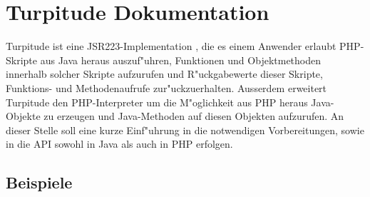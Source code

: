 \chapter{Turpitude Dokumentation}
\label{sec:app1}

Turpitude ist eine JSR223-Implementation \cite{JSRHP}, die es einem Anwender erlaubt PHP-Skripte
aus Java heraus auszuf"uhren, Funktionen und Objektmethoden innerhalb solcher Skripte aufzurufen
und R"uckgabewerte dieser Skripte, Funktions- und Methodenaufrufe zur"uckzuerhalten.
Ausserdem erweitert Turpitude den PHP-Interpreter um die M"oglichkeit aus PHP heraus
Java-Objekte zu erzeugen und Java-Methoden auf diesen Objekten aufzurufen.
An dieser Stelle soll eine kurze Einf"uhrung in die notwendigen Vorbereitungen, sowie
in die API sowohl in Java als auch in PHP erfolgen.



\section{Beispiele}









